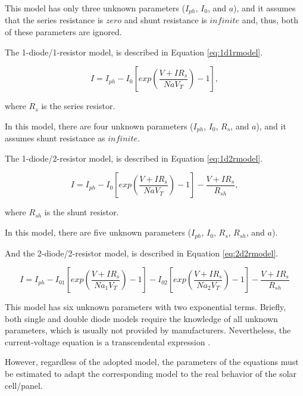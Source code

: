 This model has only three unknown parameters ($ I_{ph}$, $I_{0}$, and $a $), and it assumes that the series resistance is $ zero $ and shunt resistance is $ infinite $ and, thus, both of these parameters are ignored.
 
The 1-diode/1-resistor model, is described in Equation \ref{eq:1d1rmodel}. 

\begin{equation}
\label{eq:1d1rmodel}
I =I_{ph}-I_{0}\left[ exp \left( \dfrac{V+IR_{s}}{NaV_{T}} \right) -1 \right], 
\end{equation}

\noindent where $R_{s}$ is the series resistor.

In this model, there are four unknown parameters ($ I_{ph}$, $I_{0}$, $ R_{s} $, and $ a $), and it assumes shunt resistance as $ infinite $.

The 1-diode/2-resistor model, is described in Equation \ref{eq:1d2rmodel}. 

\begin{equation}
\label{eq:1d2rmodel}
I =I_{ph}-I_{0}\left[ exp \left( \dfrac{V+IR_{s}}{NaV_{T}} \right) -1 \right] - \dfrac{V+IR_{s}}{R_{sh}},
\end{equation}

\noindent where $R_{sh}$ is the shunt resistor.

In this model, there are five unknown parameters ($ I_{ph}$, $I_{0}$, $ R_{s} $, $ R_{sh} $, and $ a $).

And the 2-diode/2-resistor model, is described in Equation \ref{eq:2d2rmodel}. 

\begin{equation}
\label{eq:2d2rmodel}
I =I_{ph}-I_{01}\left[ exp \left( \dfrac{V+IR_{s}}{Na_{1}V_{T}} \right) -1 \right] - I_{02}\left[ exp \left( \dfrac{V+IR_{s}}{Na_{2}V_{T}} \right) -1 \right] - \dfrac{V+IR_{s}}{R_{sh}}
\end{equation}

This model has six unknown parameters with two exponential terms. 
Briefly, both single and double diode models require the knowledge of all unknown parameters, which is usually not provided by manufacturers. Nevertheless, the current-voltage equation is a transcendental expression \cite{Jakhrani}.  

However, regardless of the adopted model, the parameters of the equations must be estimated to adapt the corresponding model to the real behavior of the solar cell/panel. 

